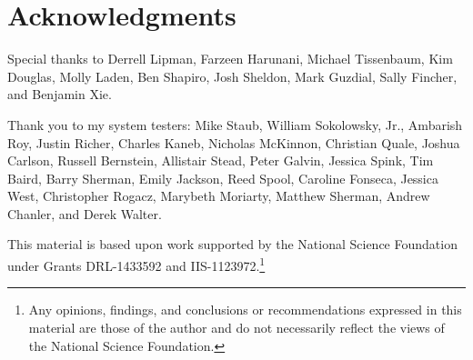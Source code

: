 \chapter*{Acknowledgments}
\renewcommand{\thefootnote}{\fnsymbol{footnote}}


Special thanks to Derrell Lipman, Farzeen Harunani, Michael Tissenbaum, Kim Douglas, Molly Laden, Ben Shapiro, Josh Sheldon, Mark Guzdial, Sally Fincher, and Benjamin Xie.

Thank you to my system testers: Mike Staub, William Sokolowsky, Jr., Ambarish Roy, Justin Richer, Charles Kaneb, Nicholas McKinnon, Christian Quale, Joshua Carlson, Russell Bernstein, Allistair Stead, Peter Galvin, Jessica Spink, Tim Baird, Barry Sherman, Emily Jackson, Reed Spool, Caroline Fonseca, Jessica West, Christopher Rogacz, Marybeth Moriarty, Matthew Sherman, Andrew Chanler, and Derek Walter.

This material is based upon work supported by the National Science Foundation under Grants DRL-1433592 and IIS-1123972.\footnote{Any opinions, findings, and conclusions or recommendations expressed in this material are those of the author and do not necessarily reflect the views of the National Science Foundation.}

\renewcommand{\thefootnote}{\arabic{footnote}}